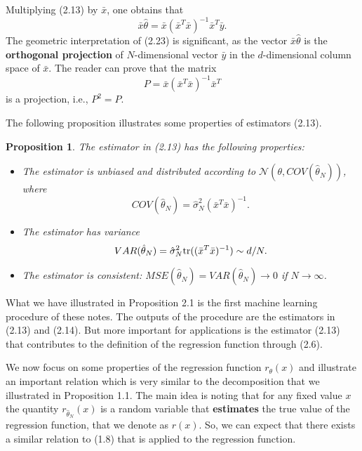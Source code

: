 \documentclass{report}
\newtheorem{proposition}{Proposition}[chapter]
\begin{document}
Multiplying (2.13) by $\bar{x}$, one obtains that
\begin{equation}
\bar{x}\hat{\theta} = \bar{x}(\bar{x}^T\bar{x})^{-1}\bar{x}^T\bar{y}.
\end{equation}
The geometric interpretation of (2.23) is significant, as the vector $\bar{x}\hat{\theta}$ is the \textbf{orthogonal projection} of $N$-dimensional vector $\bar{y}$ in the $d$-dimensional column space of $\bar{x}$. The reader can prove that the matrix
\begin{equation}
P = \bar{x}(\bar{x}^T\bar{x})^{-1}\bar{x}^T
\end{equation}
is a projection, i.e., $P^2 = P$.

The following proposition illustrates some properties of estimators (2.13).

\begin{proposition}
The estimator in (2.13) has the following properties:
\begin{itemize}
\item The estimator is unbiased and distributed according to $\mathcal{N}(\theta, COV(\hat{\theta}_N))$, where
\begin{equation}
COV(\hat{\theta}_N) = \hat{\sigma}_N^2(\bar{x}^T\bar{x})^{-1}.
\end{equation}
\item The estimator has variance
\begin{equation}
VAR(\hat{\theta}_N) = \hat{\sigma}^2_N\textup{tr}((\bar{x}^T\bar{x})^{-1}) \sim d/N.
\end{equation}
\item The estimator is consistent: $MSE(\hat{\theta}_N) = VAR(\hat{\theta}_N) \to 0$ if $N \to \infty$.
\end{itemize}
\end{proposition}

What we have illustrated in Proposition 2.1 is the first machine learning procedure of these notes. The outputs of the procedure are the estimators in (2.13) and (2.14). But more important for applications is the estimator (2.13) that contributes to the definition of the regression function through (2.6).

We now focus on some properties of the regression function $r_\theta(x)$ and illustrate an important relation which is very similar to the decomposition that we illustrated in Proposition 1.1. The main idea is noting that for any fixed value $x$ the quantity $r_{\hat{\theta}_N}(x)$ is a random variable that \textbf{estimates} the true value of the regression function, that we denote as $r(x)$. So, we can expect that there exists a similar relation to (1.8) that is applied to the regression function.
\end{document}
